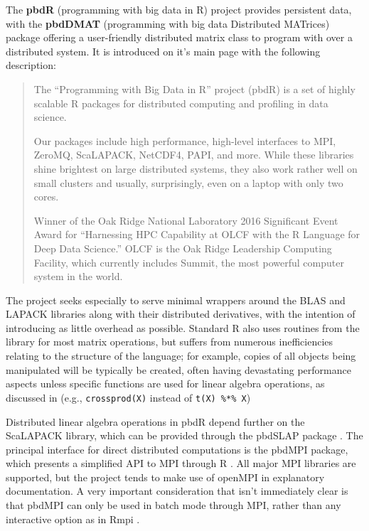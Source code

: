 The \textbf{pbdR} (programming with big data in R) project provides persistent data, with the \textbf{pbdDMAT} (programming with big data Distributed MATrices) package offering a user-friendly distributed matrix class to program with over a distributed system.
It is introduced on it's main page with the
following description:
\begin{quote}
        The ``Programming with Big Data in R'' project (pbdR) is a set of highly scalable
        R packages for distributed computing and profiling in data science.

        Our packages include high performance, high-level interfaces to MPI, ZeroMQ,
        ScaLAPACK, NetCDF4, PAPI, and more. While these libraries shine brightest on
        large distributed systems, they also work rather well on small clusters and
        usually, surprisingly, even on a laptop with only two cores.

        Winner of the Oak Ridge National Laboratory 2016 Significant Event Award for
        ``Harnessing HPC Capability at OLCF with the R Language for Deep Data Science.''
        OLCF is the Oak Ridge Leadership Computing Facility, which currently includes
        Summit, the most powerful computer system in the world.\cite{pbdR2012}
\end{quote}
The project seeks especially to serve minimal wrappers around the BLAS and LAPACK
libraries along with their distributed derivatives, with the intention of
introducing as little overhead as possible.  Standard R also uses routines from
the library for most matrix operations, but suffers from numerous
inefficiencies relating to the structure of the language; for example, copies
of all objects being manipulated will be typically be created, often having
devastating performance aspects unless specific functions are used for linear
algebra operations, as discussed in \citeauthor{schmidt2017programming} (e.g.,
\texttt{crossprod(X)} instead of \texttt{t(X) \%*\% X})

Distributed linear algebra operations in pbdR depend further on the ScaLAPACK
library, which can be provided through the pbdSLAP package \cite{Chen2012pbdSLAPpackage}.
The principal interface for direct distributed computations is the pbdMPI
package, which presents a simplified API to MPI through R
\cite{Chen2012pbdMPIpackage}.  All major MPI libraries are supported, but the
project tends to make use of openMPI in explanatory documentation. A very
important consideration that isn't immediately clear  is that pbdMPI can only
be used in batch mode through MPI, rather than any interactive option as in
Rmpi \cite{yu02:_rmpi}.

